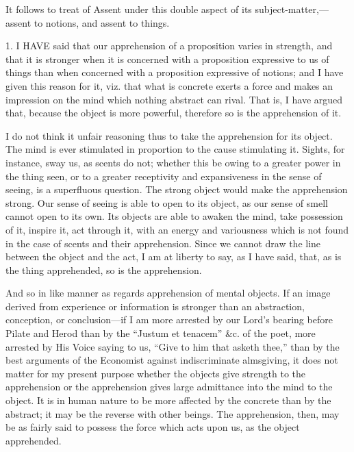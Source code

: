 It follows to treat of Assent under this double aspect of its
subject-matter,—assent to notions, and assent to things.


1. I HAVE said that our apprehension of a proposition varies
in strength, and that it is stronger when it is concerned with a
proposition expressive to us of things than when concerned with a
proposition expressive of notions; and I have given this reason for
it, viz. that what is concrete exerts a force and makes an impression
on the mind which nothing abstract can rival. That is, I have argued
that, because the object is more powerful, therefore so is the
apprehension of it.

I do not think it unfair reasoning thus to take the apprehension
for its object. The mind is ever stimulated in proportion to the cause
stimulating it. Sights, for instance, sway us, as scents do not;
whether this be owing to a greater power in the thing seen, or to a
greater receptivity and expansiveness in the sense of seeing, is a
superfluous question. The strong object would make the apprehension
strong. Our sense of seeing is able to open to its object, as our
sense of smell cannot open to its own. Its objects are able to awaken
the mind, take possession of it, inspire it, act through it, with
an energy and variousness which is not found in the case of scents and
their apprehension. Since we cannot draw the line between the object
and the act, I am at liberty to say, as I have said, that, as is the
thing apprehended, so is the apprehension.

And so in like manner as regards apprehension of mental objects. If
an image derived from experience or information is stronger than an
abstraction, conception, or conclusion—if I am more arrested by our
Lord's bearing before Pilate and Herod than by the ``Justum et
tenacem'' \&c. of the poet, more arrested by His Voice saying
to us, ``Give to him that asketh thee,'' than by the best
arguments of the Economist against indiscriminate almsgiving, it does
not matter for my present purpose whether the objects give strength to
the apprehension or the apprehension gives large admittance into the
mind to the object. It is in human nature to be more affected by the
concrete than by the abstract; it may be the reverse with other
beings. The apprehension, then, may be as fairly said to possess the
force which acts upon us, as the object apprehended.

